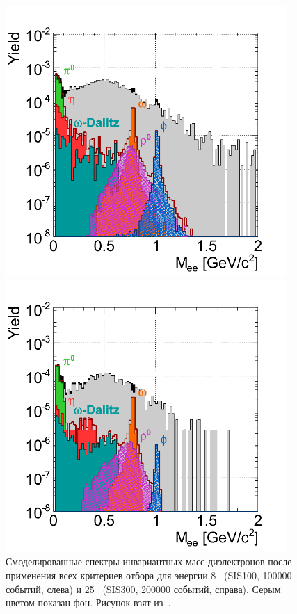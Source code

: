 
\begin{figure}[H]
\begin{minipage}[t]{0.495\textwidth}
\includegraphics[width=0.95\textwidth]{pictures/InvMassSpectr1.png}
\end{minipage}
\begin{minipage}[t]{0.495\textwidth}
\includegraphics[width=0.95\textwidth]{pictures/InvMassSpectr2.png}
\end{minipage}
\caption{Смоделированные спектры инвариантных масс диэлектронов после применения всех критериев отбора для энергии 8~\GeVperNucl{} (SIS100, 100000 событий, слева) и 25~\GeVperNucl{} (SIS300, 200000 событий, справа). Серым цветом показан фон. Рисунок взят из~\cite{TDR_RICH}.}
\label{fig:InvMassSpectra}
\end{figure}

